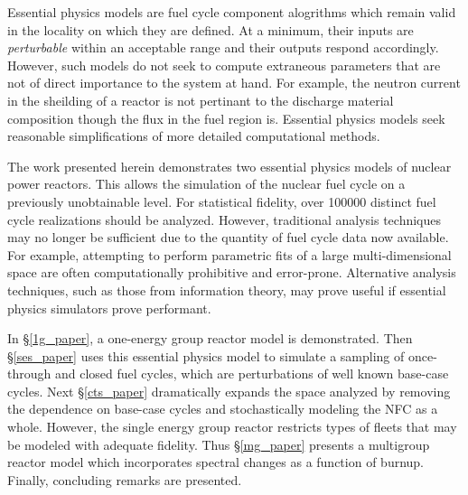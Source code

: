 Essential physics models are fuel cycle component alogrithms which remain valid in the 
locality on which they are defined.  At a minimum, their inputs are \emph{perturbable} 
within an acceptable range and their outputs respond accordingly.  However, such 
models do not seek to compute extraneous parameters that are not of direct importance
to the system at hand.  For example, the neutron current in the sheilding of a reactor
is not pertinant to the discharge material composition though the flux in the fuel region is.
Essential physics models seek reasonable simplifications of more detailed computational methods.

The work presented herein demonstrates two essential physics models of nuclear power reactors.
This allows the simulation of the nuclear fuel cycle on a previously unobtainable level.
For statistical fidelity, over 100000 distinct fuel cycle realizations should be analyzed.  
However, traditional analysis techniques may no longer be sufficient due to the quantity of fuel cycle data now 
available. For example, attempting to perform parametric fits of a large multi-dimensional 
space are often computationally prohibitive and error-prone.
Alternative analysis techniques, such as those from information theory, may prove useful
if essential physics simulators prove performant.

In \S \ref{1g_paper}, a one-energy group reactor model is demonstrated.  Then \S \ref{ses_paper}
uses this essential physics model to simulate a sampling of once-through and closed fuel cycles,
which are perturbations of well known base-case cycles.  Next \S \ref{cts_paper} dramatically
expands the space analyzed by removing the dependence on base-case cycles and stochastically 
modeling the NFC as a whole.  However, the single energy group reactor restricts types of fleets
that may be modeled with adequate fidelity.  Thus \S \ref{mg_paper} presents a multigroup reactor
model which incorporates spectral changes as a function of burnup.  Finally, concluding remarks
are presented.


